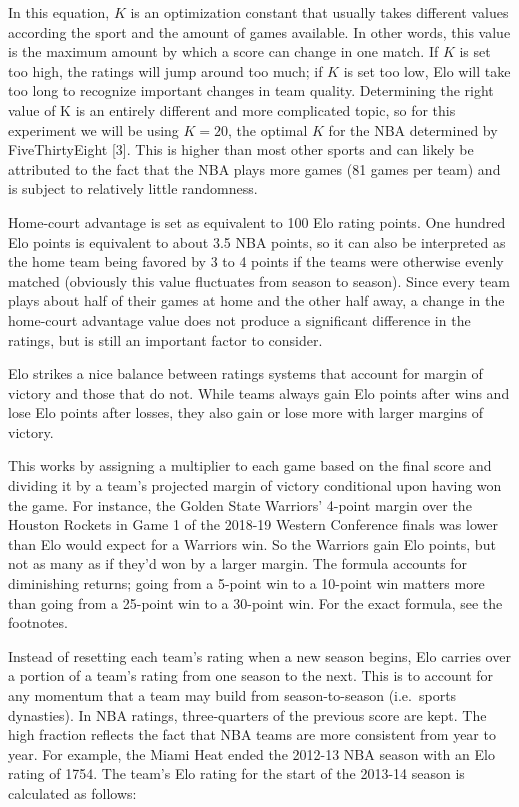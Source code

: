 \documentclass[]{article}
\begin{document}
In this equation, \(K\) is an optimization constant that usually takes
different values according the sport and the amount of games available.
In other words, this value is the maximum amount by which a score can
change in one match. If \(K\) is set too high, the ratings will jump
around too much; if \(K\) is set too low, Elo will take too long to
recognize important changes in team quality. Determining the right value
of K is an entirely different and more complicated topic, so for this
experiment we will be using \(K=20\), the optimal \(K\) for the NBA
determined by FiveThirtyEight {[}3{]}. This is higher than most other
sports and can likely be attributed to the fact that the NBA plays more
games (81 games per team) and is subject to relatively little
randomness.

Home-court advantage is set as equivalent to 100 Elo rating points. One
hundred Elo points is equivalent to about 3.5 NBA points, so it can also
be interpreted as the home team being favored by 3 to 4 points if the
teams were otherwise evenly matched (obviously this value fluctuates
from season to season). Since every team plays about half of their games
at home and the other half away, a change in the home-court advantage
value does not produce a significant difference in the ratings, but is
still an important factor to consider.

Elo strikes a nice balance between ratings systems that account for
margin of victory and those that do not. While teams always gain Elo
points after wins and lose Elo points after losses, they also gain or
lose more with larger margins of victory.

This works by assigning a multiplier to each game based on the final
score and dividing it by a team's projected margin of victory
conditional upon having won the game. For instance, the Golden State
Warriors' 4-point margin over the Houston Rockets in Game 1 of the
2018-19 Western Conference finals was lower than Elo would expect for a
Warriors win. So the Warriors gain Elo points, but not as many as if
they'd won by a larger margin. The formula accounts for diminishing
returns; going from a 5-point win to a 10-point win matters more than
going from a 25-point win to a 30-point win. For the exact formula, see
the footnotes.

Instead of resetting each team's rating when a new season begins, Elo
carries over a portion of a team's rating from one season to the next.
This is to account for any momentum that a team may build from
season-to-season (i.e.~sports dynasties). In NBA ratings, three-quarters
of the previous score are kept. The high fraction reflects the fact that
NBA teams are more consistent from year to year. For example, the Miami
Heat ended the 2012-13 NBA season with an Elo rating of 1754. The team's
Elo rating for the start of the 2013-14 season is calculated as follows:
\end{document}

